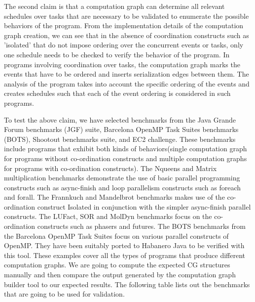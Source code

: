 The second claim is that a computation graph can determine all relevant schedules over tasks that are necessary to be validated to enumerate the possible behaviors of the program. From the implementation details of the computation graph creation, we can see that in the absence of coordination constructs such as 'isolated' that do not impose ordering over the concurrent events or tasks, only one schedule needs to be checked to verify the behavior of the program. In programs involving coordination over tasks, the computation graph marks the events that have to be ordered and inserts serialization edges between them. The analysis of the program takes into account the specific ordering of the events and creates schedules such that each of the event ordering is considered in such programs.

To test the above claim, we have selected benchmarks from the Java Grande Forum benchmarks (JGF) suite, Barcelona OpenMP Task Suites benchmarks (BOTS), Shootout benchmarks suite, and EC2 challenge. These benchmarks include programs that exhibit both kinds of behaviors(single computation graph for programs without co-ordination constructs and multiple computation graphs for programs with co-ordination constructs). The Nqueens and Matrix multiplication benchmarks demonstrate the use of basic parallel programming constructs such as async-finish and loop parallelism constructs such as foreach and forall. The Frannkuch and Mandelbrot benchmarks makes use of the co-ordination construct Isolated in conjunction with the simpler async-finish parallel constructs. The LUFact, SOR and MolDyn benchmarks focus on the co-ordination constructs such as phasers and futures. The BOTS  benchmarks from the Barcelona OpenMP Task Suites focus on various parallel constructs of OpenMP. They have been suitably ported to Habanero Java  to be verified with this tool. These examples cover all the types of programs that produce different computation graphs. We are going to compute the expected CG structures manually and then compare the output generated by the computation graph builder tool to our expected results. The following table lists out the benchmarks that are going to be used for validation.\\

